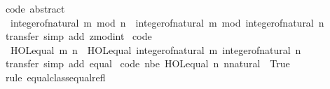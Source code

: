 \begin{isabellebody}
\endisatagproof
{\isafoldproof}%
%
\isadelimproof
\isanewline
%
\endisadelimproof
\isanewline
{}\isamarkupfalse%
\ {\isacharbrackleft}{\kern0pt}code\ abstract{\isacharbrackright}{\kern0pt}{\isacharcolon}{\kern0pt}\isanewline
\ \ {\isachardoublequoteopen}integer{\isacharunderscore}{\kern0pt}of{\isacharunderscore}{\kern0pt}natural\ {\isacharparenleft}{\kern0pt}m\ mod\ n{\isacharparenright}{\kern0pt}\ {\isacharequal}{\kern0pt}\ integer{\isacharunderscore}{\kern0pt}of{\isacharunderscore}{\kern0pt}natural\ m\ mod\ integer{\isacharunderscore}{\kern0pt}of{\isacharunderscore}{\kern0pt}natural\ n{\isachardoublequoteclose}\isanewline
%
\isadelimproof
\ \ %
\endisadelimproof
%
\isatagproof
{}\isamarkupfalse%
\ transfer\ {\isacharparenleft}{\kern0pt}simp\ add{\isacharcolon}{\kern0pt}\ zmod{\isacharunderscore}{\kern0pt}int{\isacharparenright}{\kern0pt}%
\endisatagproof
{\isafoldproof}%
%
\isadelimproof
\isanewline
%
\endisadelimproof
\isanewline
{}\isamarkupfalse%
\ {\isacharbrackleft}{\kern0pt}code{\isacharbrackright}{\kern0pt}{\isacharcolon}{\kern0pt}\isanewline
\ \ {\isachardoublequoteopen}HOL{\isachardot}{\kern0pt}equal\ m\ n\ {\isasymlongleftrightarrow}\ HOL{\isachardot}{\kern0pt}equal\ {\isacharparenleft}{\kern0pt}integer{\isacharunderscore}{\kern0pt}of{\isacharunderscore}{\kern0pt}natural\ m{\isacharparenright}{\kern0pt}\ {\isacharparenleft}{\kern0pt}integer{\isacharunderscore}{\kern0pt}of{\isacharunderscore}{\kern0pt}natural\ n{\isacharparenright}{\kern0pt}{\isachardoublequoteclose}\isanewline
%
\isadelimproof
\ \ %
\endisadelimproof
%
\isatagproof
{}\isamarkupfalse%
\ transfer\ {\isacharparenleft}{\kern0pt}simp\ add{\isacharcolon}{\kern0pt}\ equal{\isacharparenright}{\kern0pt}%
\endisatagproof
{\isafoldproof}%
%
\isadelimproof
\isanewline
%
\endisadelimproof
\isanewline
{}\isamarkupfalse%
\ {\isacharbrackleft}{\kern0pt}code\ nbe{\isacharbrackright}{\kern0pt}{\isacharcolon}{\kern0pt}\ {\isachardoublequoteopen}HOL{\isachardot}{\kern0pt}equal\ n\ {\isacharparenleft}{\kern0pt}n{\isacharcolon}{\kern0pt}{\isacharcolon}{\kern0pt}natural{\isacharparenright}{\kern0pt}\ {\isasymlongleftrightarrow}\ True{\isachardoublequoteclose}\isanewline
%
\isadelimproof
\ \ %
\endisadelimproof
%
\isatagproof
{}\isamarkupfalse%
\ {\isacharparenleft}{\kern0pt}rule\ equal{\isacharunderscore}{\kern0pt}class{\isachardot}{\kern0pt}equal{\isacharunderscore}{\kern0pt}refl{\isacharparenright}{\kern0pt}%
\endisatagproof
{\isafoldproof}%
%
\isadelimproof
\isanewline
%
\endisadelimproof
\isanewline
{}\isamarkupfalse%

\end{isabellebody}
